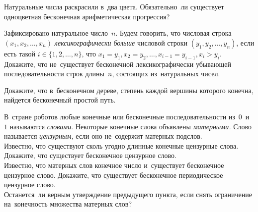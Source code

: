 


\begin{problems}

\item
Натуральные числа раскрасили в~два цвета.
Обязательно~ли существует одноцветная бесконечная арифметическая прогрессия?

\item
Зафиксировано натуральное число~$n$.
Будем говорить, что числовая строка $(x_{1}, x_{2}, \ldots, x_{n})$
\emph{лексикографически больше}
числовой строки $(y_{1}, y_{2}, \ldots, y_{n})$, если есть такой
$i \in \{ 1, 2, \ldots, n \}$, что
$x_{1} = y_{1}, x_{2} = y_{2}, \ldots, x_{i-1} = y_{i-1}, x_{i} > y_{i}$.
\\
Докажите, что не~существует бесконечной лексикографически
убывающей последовательности строк длины~$n$, состоящих из~натуральных чисел.


\item
{}
Докажите, что в~бесконечном дереве, степень каждой вершины которого конечна,
найдется бесконечный простой путь.

\item
В~стране роботов любые конечные или бесконечные последовательности из~$0$~и~$1$
называются \emph{словами}.
Некоторые конечные слова объявлены \emph{матерными.}
Слово называется \emph{цензурным,} если оно не~содержит матерных подслов.
\\
\subproblem
Известно, что существуют сколь угодно длинные конечные цензурные слова.
Докажите, что существует бесконечное цензурное слово.
\\
\subproblem
Известно, что матерных слов конечное число и~существует бесконечное цензурное
слово.
Докажите, что существует бесконечное периодическое цензурное слово.
\\
\subproblem
Останется~ли верным утверждение предыдущего пункта, если снять ограничение
на~конечность множества матерных слов?


\end{problems}
